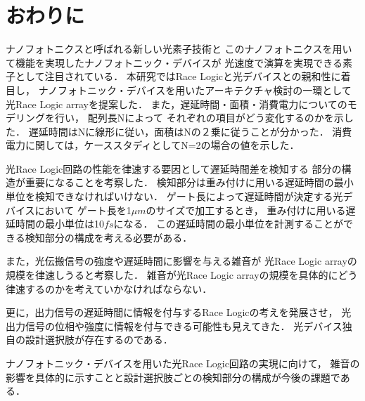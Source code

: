 \chapter{おわりに}

ナノフォトニクスと呼ばれる新しい光素子技術と
このナノフォトニクスを用いて機能を実現したナノフォトニック・デバイスが
光速度で演算を実現できる素子として注目されている．
本研究ではRace Logicと光デバイスとの親和性に着目し，
ナノフォトニック・デバイスを用いたアーキテクチャ検討の一環として
光Race Logic arrayを提案した．
また，遅延時間・面積・消費電力についてのモデリングを行い，
配列長Nによって
それぞれの項目がどう変化するのかを示した．
遅延時間はNに線形に従い，面積はNの２乗に従うことが分かった．
消費電力に関しては，ケーススタディとしてN=2の場合の値を示した．

光Race Logic回路の性能を律速する要因として遅延時間差を検知する
部分の構造が重要になることを考察した．
検知部分は重み付けに用いる遅延時間の最小単位を検知できなければいけない．
ゲート長によって遅延時間が決定する光デバイスにおいて
ゲート長を1$\mu m$のサイズで加工するとき，
重み付けに用いる遅延時間の最小単位は10$fs$になる．
この遅延時間の最小単位を計測することができる検知部分の構成を考える必要がある．

また，光伝搬信号の強度や遅延時間に影響を与える雑音が
光Race Logic arrayの規模を律速しうると考察した．
雑音が光Race Logic arrayの規模を具体的にどう律速するのかを考えていかなければならない．

更に，出力信号の遅延時間に情報を付与するRace Logicの考えを発展させ，
光出力信号の位相や強度に情報を付与できる可能性も見えてきた．
光デバイス独自の設計選択肢が存在するのである．

ナノフォトニック・デバイスを用いた光Race Logic回路の実現に向けて，
雑音の影響を具体的に示すことと設計選択肢ごとの検知部分の構成が今後の課題である．


